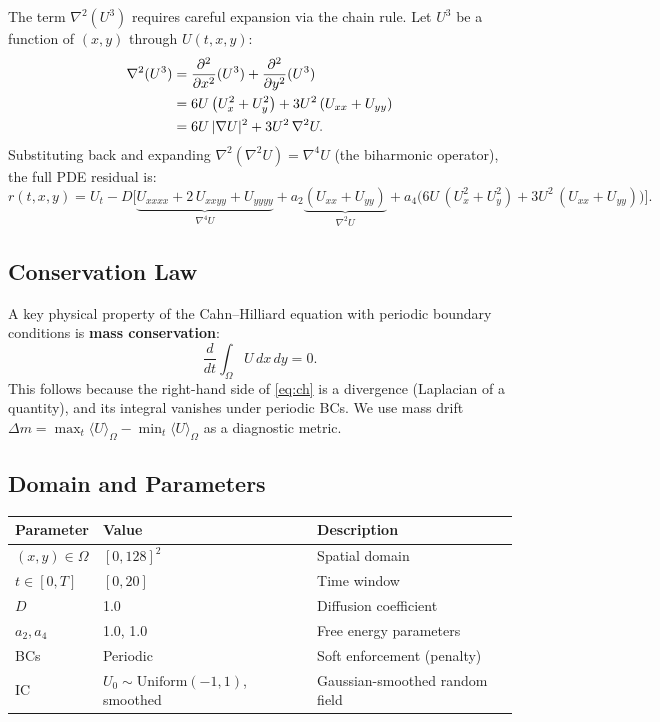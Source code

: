 \documentclass[11pt,a4paper]{article}
\begin{document}
The term $\nabla^2(U^3)$ requires careful expansion via the chain rule.
Let $U^3$ be a function of $(x,y)$ through $U(t,x,y)$:
\begin{align}
  \nabla^2(U^3)
  &= \frac{\partial^2}{\partial x^2}(U^3) + \frac{\partial^2}{\partial y^2}(U^3) \notag\\
  &= 6U\left(U_x^2 + U_y^2\right) + 3U^2\left(U_{xx} + U_{yy}\right) \notag\\
  &= 6U\,|\nabla U|^2 + 3U^2\,\nabla^2 U.
  \label{eq:lap_U3}
\end{align}
Substituting back and expanding $\nabla^2(\nabla^2 U) = \nabla^4 U$
(the biharmonic operator), the full PDE residual is:
\begin{equation}
  r(t,x,y) = U_t - D\Big[
    \underbrace{U_{xxxx} + 2\,U_{xxyy} + U_{yyyy}}_{\nabla^4 U}
    + a_2\underbrace{(U_{xx} + U_{yy})}_{\nabla^2 U}
    + a_4\big(6U\,(U_x^2 + U_y^2) + 3U^2\,(U_{xx} + U_{yy})\big)
  \Big].
  \label{eq:residual}
\end{equation}

\subsection{Conservation Law}

A key physical property of the Cahn--Hilliard equation with periodic
boundary conditions is \textbf{mass conservation}:
\begin{equation}
  \frac{d}{dt} \int_\Omega U \, dx \, dy = 0.
  \label{eq:mass}
\end{equation}
This follows because the right-hand side of \eqref{eq:ch} is a divergence
(Laplacian of a quantity), and its integral vanishes under periodic BCs.
We use mass drift $\Delta m = \max_t \langle U \rangle_\Omega - \min_t \langle U \rangle_\Omega$
as a diagnostic metric.

\subsection{Domain and Parameters}

\begin{center}
\begin{tabular}{lll}
\toprule
\textbf{Parameter} & \textbf{Value} & \textbf{Description} \\
\midrule
$(x, y) \in \Omega$  & $[0, 128]^2$ & Spatial domain \\
$t \in [0, T]$       & $[0, 20]$    & Time window \\
$D$                   & 1.0          & Diffusion coefficient \\
$a_2, a_4$            & 1.0, 1.0     & Free energy parameters \\
BCs                   & Periodic     & Soft enforcement (penalty) \\
IC                    & $U_0 \sim \text{Uniform}(-1, 1)$, smoothed & Gaussian-smoothed random field \\
\bottomrule
\end{tabular}
\end{center}
\end{document}

